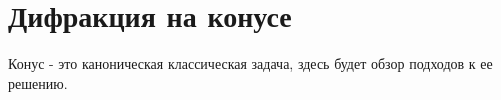 \section{Дифракция на конусе}
Конус - это каноническая классическая задача, здесь будет обзор подходов к ее решению.


%
